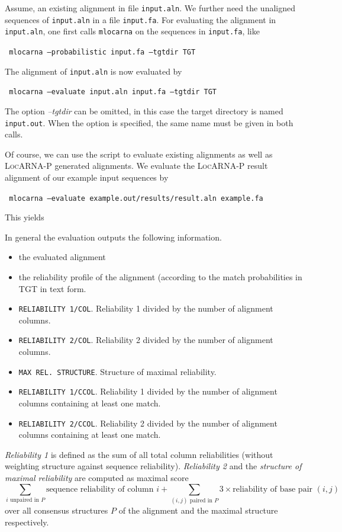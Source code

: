 \documentclass{article}
\newcommand{\LocARNAP}{\textsc{LocARNA-P}}
\newenvironment{ttbox}{%
  \begin{framed}\begin{minipage}{1.0\textwidth}\tt}%
{\end{minipage}\end{framed}\noindent}
\begin{document}
Assume, an existing alignment in file \texttt{input.aln}. We further
need the unaligned sequences of \texttt{input.aln} in a file
\texttt{input.fa}.  For evaluating the alignment in
\texttt{input.aln}, one first calls \texttt{mlocarna} on the sequences
in \texttt{input.fa}, like
\begin{ttbox}
  mlocarna --probabilistic input.fa --tgtdir TGT
\end{ttbox}
The alignment of \texttt{input.aln} is now evaluated by
\begin{ttbox}
  mlocarna --evaluate input.aln input.fa --tgtdir TGT
\end{ttbox}
The option \emph{--tgtdir} can be omitted, in this case the target
directory is named \texttt{input.out}. When the option is specified,
the same name must be given in both calls.

Of course, we can use the script to evaluate existing alignments as
well as \LocARNAP{} generated alignments. We evaluate the \LocARNAP{}
result alignment of our example input sequences by
\begin{ttbox}
  mlocarna --evaluate example.out/results/result.aln example.fa
\end{ttbox}
This yields
\begin{framed}
  
\end{framed}

In general the evaluation outputs the following information.
\begin{itemize}
  \item the evaluated alignment
  \item the reliability profile of the alignment (according to the
    match probabilities in TGT in text form.
  \item \texttt{RELIABILITY 1/COL}. Reliability 1 divided by the number of alignment columns.
  \item \texttt{RELIABILITY 2/COL}. Reliability 2 divided by the number of alignment columns.
  \item \texttt{MAX REL. STRUCTURE}. Structure of maximal reliability.
  \item \texttt{RELIABILITY 1/CCOL}. Reliability 1 divided by the
    number of alignment columns containing at least one match.
  \item \texttt{RELIABILITY 2/CCOL}. Reliability 2 divided by the number of alignment columns containing at least one match.
\end{itemize}
\emph{Reliability 1} is defined as the sum of all total column
reliabilities (without weighting structure against sequence
reliability). \emph{Reliability 2} and the \emph{structure of maximal
  reliability} are computed as maximal score
\begin{displaymath}
  \sum_{\text{$i$ unpaired in $P$}} \text{sequence reliability of column $i$} + \sum_{\text{$(i,j)$ paired in $P$}} 3\times\text{reliability of base pair $(i,j)$}
\end{displaymath}
over all consensus structures $P$ of the alignment and the maximal
structure respectively.
\end{document}
